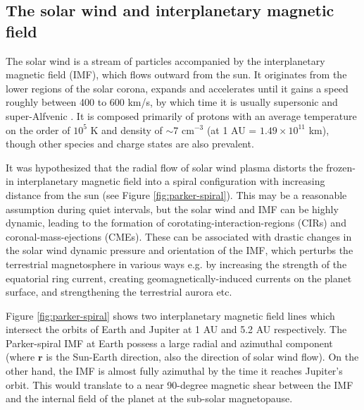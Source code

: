 \subsection{The solar wind and interplanetary magnetic field}
The solar wind is a stream of particles accompanied by the interplanetary magnetic field (IMF), which flows outward from the sun. It originates from the lower regions of the solar corona, expands and accelerates until it gains a speed roughly between 400 to 600 km/s, by which time it is usually supersonic and super-Alfvenic \cite{Gombosi1998PhysicsEnvironment}. It is composed primarily of protons with an average temperature on the order of $10^5$ K and density of $\sim$7 cm$^{-3}$ (at 1 AU = $1.49 \times 10^{11}$ km), though other species and charge states are also prevalent.

It was hypothesized that the radial flow of solar wind plasma distorts the frozen-in interplanetary magnetic field into a spiral configuration with increasing distance from the sun \cite{Parker1958DynamicsFields.,Ness1964SolarField} (see Figure \ref{fig:parker-spiral}). This may be a reasonable assumption during quiet intervals, but the solar wind and IMF can be highly dynamic, leading to the formation of corotating-interaction-regions (CIRs) and coronal-mass-ejections (CMEs). These can be associated with drastic changes in the solar wind dynamic pressure and orientation of the IMF, which perturbs the terrestrial magnetosphere in various ways \cite{Borovsky2006DifferencesStorms,Denton2006GeomagneticWind} e.g. by increasing the strength of the equatorial ring current, creating geomagnetically-induced currents on the planet surface, and strengthening the terrestrial aurora etc.

Figure \ref{fig:parker-spiral} shows two interplanetary magnetic field lines which intersect the orbits of Earth and Jupiter at 1 AU and 5.2 AU respectively. The Parker-spiral IMF at Earth possess a large radial and azimuthal component (where $\mathbf{r}$ is the Sun-Earth direction, also the direction of solar wind flow). On the other hand, the IMF is almost fully azimuthal by the time it reaches Jupiter's orbit. This would translate to a near 90-degree magnetic shear between the IMF and the internal field of the planet at the sub-solar magnetopause. 

